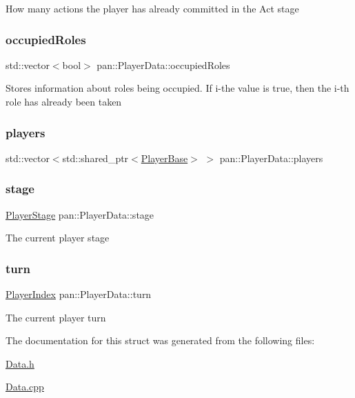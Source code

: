 How many actions the player has already committed in the Act stage \mbox{\label{structpan_1_1_player_data_aa79e564016ca865b17e4bf1b241fc827}} 
\subsubsection{\texorpdfstring{occupied\+Roles}{occupiedRoles}}
{\footnotesize\ttfamily std\+::vector$<$bool$>$ pan\+::\+Player\+Data\+::occupied\+Roles}

Stores information about roles being occupied. If i-\/the value is true, then the i-\/th role has already been taken \mbox{\label{structpan_1_1_player_data_a44a9f5f24c1020e2c186205e08c184c5}} 
\subsubsection{\texorpdfstring{players}{players}}
{\footnotesize\ttfamily std\+::vector$<$std\+::shared\+\_\+ptr$<$\hyperlink{classpan_1_1_player_base}{Player\+Base}$>$ $>$ pan\+::\+Player\+Data\+::players}

\mbox{\label{structpan_1_1_player_data_a8f06369e6df4f62a3d5be54cace7aa17}} 
\subsubsection{\texorpdfstring{stage}{stage}}
{\footnotesize\ttfamily \hyperlink{namespacepan_a5c203ea0600f2bca14baf8f38e5bac5d}{Player\+Stage} pan\+::\+Player\+Data\+::stage}

The current player stage \mbox{\label{structpan_1_1_player_data_a5e25e3064088436cb55df4d1fe256cb0}} 
\subsubsection{\texorpdfstring{turn}{turn}}
{\footnotesize\ttfamily \hyperlink{namespacepan_a0cdabf874fbf1bb3a1f0152d108c2909}{Player\+Index} pan\+::\+Player\+Data\+::turn}

The current player turn 

The documentation for this struct was generated from the following files\+:\begin{DoxyCompactItemize}
\item 
\hyperlink{_data_8h}{Data.\+h}\item 
\hyperlink{_data_8cpp}{Data.\+cpp}\end{DoxyCompactItemize}
